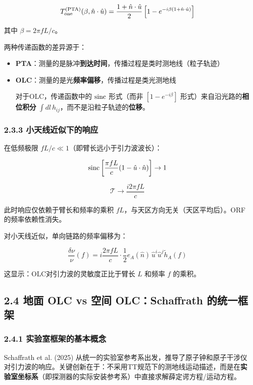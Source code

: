 \documentclass[12pt,a4paper]{article}
\begin{document}
$$T_{\rm one}^{\rm (PTA)}(\beta, \hat{n}\cdot\hat{u}) = \frac{1 + \hat{n}\cdot\hat{u}}{2}\left[1 - e^{-i\beta(1+\hat{n}\cdot\hat{u})}\right]$$

其中 $\beta = 2\pi f L/c$。

两种传递函数的差异源于：
\begin{itemize}
  \item \textbf{PTA}：测量的是脉冲\textbf{到达时间}，传播过程是类时测地线（粒子轨迹）
  \item \textbf{OLC}：测量的是光\textbf{频率偏移}，传播过程是类光测地线

对于OLC，传递函数中的 ${\rm sinc}$ 形式（而非 $[1 - e^{-i\beta}]$ 形式）来自沿光路的\textbf{相位积分} $\int dl\, h_{ij}$，而不是沿粒子轨迹的\textbf{位移}。

\end{itemize}
\subsubsection{2.3.3 小天线近似下的响应}


在低频极限 $fL/c \ll 1$（即臂长远小于引力波波长）：

$${\rm sinc}\left[\frac{\pi f L}{c}(1 - \hat{u}\cdot\hat{n})\right] \to 1$$

$$\mathcal{T} \to \frac{i2\pi f L}{c}$$

此时响应仅依赖于臂长和频率的乘积 $fL$，与天区方向无关（天区平均后）。ORF的频率依赖性消失。

对小天线近似，单向链路的频率偏移为：

$$\frac{\delta\nu}{\nu}(f) = i\frac{2\pi f L}{c}\cdot\frac{1}{2} e_A(\hat{n})\, \hat{u}^i \hat{u}^j \tilde{h}_A(f)$$

这显示：OLC对引力波的灵敏度正比于臂长 $L$ 和频率 $f$ 的乘积。

\subsection{2.4 地面 OLC vs 空间 OLC：Schaffrath 的统一框架}


\subsubsection{2.4.1 实验室框架的基本概念}


Schaffrath et al. (2025) 从统一的实验室参考系出发，推导了原子钟和原子干涉仪对引力波的响应。关键创新在于：不采用TT规范下的测地线运动描述，而是在\textbf{实验室坐标系}（即探测器的实际安装参考系）中直接求解薛定谔方程/运动方程。
\end{document}
